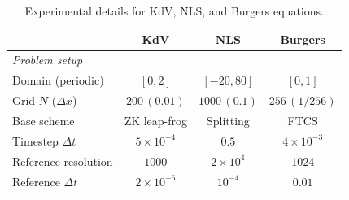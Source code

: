 \documentclass[letterpaper]{article} %
\begin{document}
\begin{table}[h]
\centering
\setlength{\tabcolsep}{4pt}
\renewcommand{\arraystretch}{1.15}
\caption{Experimental details for KdV, NLS, and Burgers equations.}
\label{tab:exp-details-others}
\begin{tabular}{l ccc}
\toprule
& \textbf{KdV} & \textbf{NLS} & \textbf{Burgers} \\
\midrule
\multicolumn{4}{l}{\textit{Problem setup}}\\
Domain (periodic)    & $[0,2]$ & $[-20,80]$ & $[0,1]$ \\
Grid $N$ ($\Delta x$) & $200\,(0.01)$ & $1000\,(0.1)$ & $256\,(1/256)$ \\
Base scheme          & ZK leap-frog & Splitting & FTCS \\
Timestep $\Delta t$  & $5{\times}10^{-4}$ & $0.5$ & $4{\times}10^{-3}$ \\
Reference resolution     & $1000$ & $2{\times}10^{4}$ & $1024$ \\
Reference $\Delta t$     & $2{\times}10^{-6}$ & $10^{-4}$ & $0.01$ \\


\end{tabular}
\end{table}
\end{document}
